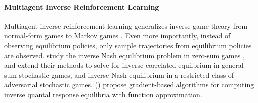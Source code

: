 \paragraph{Multiagent Inverse Reinforcement Learning}

Multiagent inverse reinforcement learning generalizes inverse game theory from normal-form games to Markov games \cite{natarajan2010multi, lin2019multi, yu2019multi, lin2017multiagent, fu2021evaluating}.
Even more importantly, instead of observing equilibrium policies, only sample trajectories from equilibrium policies are observed.
\citet{lin2019multi} study the inverse Nash equilibrium problem in zero-sum games \cite{lin2017multiagent}, and extend their methods to solve for inverse correlated equilbrium in general-sum stochastic games, and inverse Nash equilibrium in a restricted class of %
adversarial stochastic games.
\citeauthor{yu2019multi} (\citeyear{yu2019multi}) propose gradient-based algorithms for computing inverse quantal response equilibria with function approximation.
